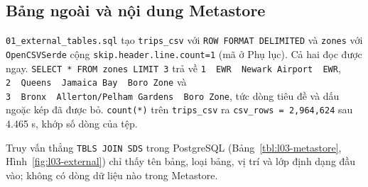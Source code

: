 \documentclass[
  12pt,
  a4paper,
]{article}
\begin{document}
\subsection{Bảng ngoài và nội dung
Metastore}\label{sec:l03-res-external}

\texttt{01\_}\allowbreak{}\texttt{external\_}\allowbreak{}\texttt{tables.}\allowbreak{}\texttt{sql}\allowbreak{}
tạo \texttt{trips\_csv} với \texttt{ROW\ FORMAT\ DELIMITED}\allowbreak{}
và \texttt{zones} với \texttt{OpenCSVSerde} cộng
\texttt{skip.}\allowbreak{}\texttt{header.}\allowbreak{}\texttt{line.}\allowbreak{}\texttt{count=}\allowbreak{}\texttt{1}\allowbreak{}
(mã ở Phụ lục). Cả hai đọc được ngay.
\texttt{SELECT\ *\ FROM\ zones\ LIMIT\ 3}\allowbreak{} trả về
\texttt{1\ \textbar{}\ EWR\ \textbar{}\ Newark\ Airport\ \textbar{}\ EWR}\allowbreak{},
\texttt{2\ \textbar{}\ Queens\ \textbar{}\ Jamaica\ Bay\ \textbar{}\ Boro\ Zone}\allowbreak{}
và
\texttt{3\ \textbar{}\ Bronx\ \textbar{}\ Allerton/}\allowbreak{}\texttt{Pelham\ Gardens\ \textbar{}\ Boro\ Zone}\allowbreak{},
tức dòng tiêu đề và dấu ngoặc kép đã được bỏ. \texttt{count(*)} trên
\texttt{trips\_csv} ra
\texttt{csv\_}\allowbreak{}\texttt{rows\ =}\allowbreak{}\texttt{\ 2,}\allowbreak{}\texttt{964,}\allowbreak{}\texttt{624}\allowbreak{}
sau 4.465 s, khớp số dòng của tệp.

Truy vấn thẳng \texttt{TBLS\ JOIN\ SDS} trong PostgreSQL
(Bảng~\ref{tbl:l03-metastore}, Hình~\ref{fig:l03-external}) chỉ thấy tên
bảng, loại bảng, vị trí và lớp định dạng đầu vào; không có dòng dữ liệu
nào trong Metastore.
\end{document}
